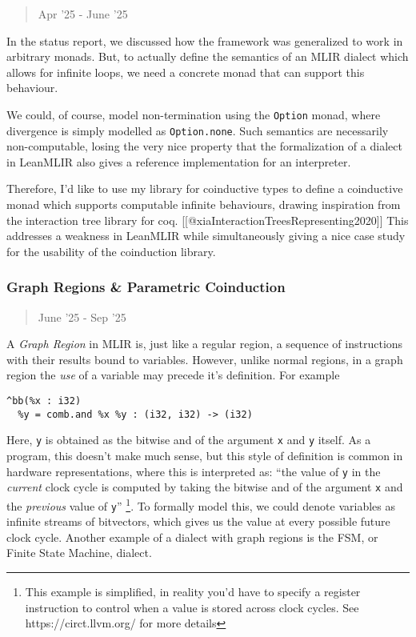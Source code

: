 \begin{quote}
Apr '25 - June '25
\end{quote}

In the status report, we discussed how the framework was generalized to
work in arbitrary monads. But, to actually define the semantics of an
MLIR dialect which allows for infinite loops, we need a concrete monad
that can support this behaviour.

We could, of course, model non-termination using the \texttt{Option}
monad, where divergence is simply modelled as \texttt{Option.none}. Such
semantics are necessarily non-computable, losing the very nice property
that the formalization of a dialect in LeanMLIR also gives a reference
implementation for an interpreter.

Therefore, I'd like to use my library for coinductive types to define a
coinductive monad which supports computable infinite behaviours, drawing
inspiration from the interaction tree library for coq.
{[}{[}@xiaInteractionTreesRepresenting2020{]}{]} This addresses a
weakness in LeanMLIR while simultaneously giving a nice case study for
the usability of the coinduction library.

\hypertarget{graph-regions-parametric-coinduction}{%
\subsubsection{Graph Regions \& Parametric
Coinduction}\label{graph-regions-parametric-coinduction}}

\begin{quote}
June '25 - Sep '25
\end{quote}

A \emph{Graph Region} in MLIR is, just like a regular region, a sequence
of instructions with their results bound to variables. However, unlike
normal regions, in a graph region the \emph{use} of a variable may
precede it's definition. For example

\begin{verbatim}
^bb(%x : i32)
  %y = comb.and %x %y : (i32, i32) -> (i32)
\end{verbatim}

Here, \texttt{y} is obtained as the bitwise and of the argument
\texttt{x} and \texttt{y} itself. As a program, this doesn't make much
sense, but this style of definition is common in hardware
representations, where this is interpreted as: ``the value of \texttt{y}
in the \emph{current} clock cycle is computed by taking the bitwise and
of the argument \texttt{x} and the \emph{previous} value of \texttt{y}''
\footnote{This example is simplified, in reality you'd have to specify a
  register instruction to control when a value is stored across clock
  cycles. See https://circt.llvm.org/ for more details}. To formally
model this, we could denote variables as infinite streams of bitvectors,
which gives us the value at every possible future clock cycle. Another
example of a dialect with graph regions is the FSM, or Finite State
Machine, dialect.

